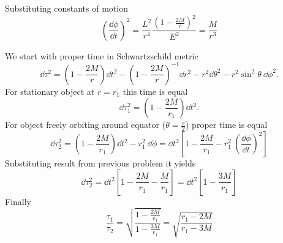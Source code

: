 %
Substituting constants of motion
%
\begin{equation}
    \boxed{\left(\frac{\dd \phi}{\dd t}\right)^2 =
        \frac{L^2}{r^4}
        \frac{\left(1-\frac{2M}{r}\right)^2}{E^2} =
        \frac{M}{r^3}}
\end{equation}
%
%

\problem

We start with proper time in Schwartzschild metric
%
\begin{equation}
    \dd \tau^2 = \left(1-\frac{2M}{r}\right) \dd t^2 -
    \left(1-\frac{2M}{r}\right)^{-1} \dd r^2 -
    r^2 \dd \theta^2 -
    r^2 \sin^2\theta~ \dd \phi ^2.
\end{equation}
%
For stationary object at $r=r_1$ this time is equal
%
\begin{equation}
    \dd \tau_1^2 = \left(1-\frac{2M}{r_1}\right) \dd t^2.
\end{equation}
%
For object freely orbiting around equator ($\theta = \frac{\pi}{2}$) proper time
is equal
%
\begin{equation}
    \dd \tau_2^2 = \left(1-\frac{2M}{r_1}\right) \dd t^2 -
    r_1^2 ~\dd \phi =
    \dd t^2 \left[1-\frac{2M}{r_1}  -
        r_1^2 ~ \left(\frac{\dd \phi}{\dd t}\right)^2\right]
\end{equation}
%
Substituting result from previous problem it yields
%
\begin{equation}
    \dd \tau_2^2 =
    \dd t^2 \left[1-\frac{2M}{r_1}  -
        \frac{M}{r_1}\right]=
    \dd t^2 \left[1-\frac{3M}{r_1}\right]
\end{equation}
%
Finally
%
\begin{equation}
    \boxed{\frac{\tau_1}{\tau_2} =
        \sqrt{\frac{1-\frac{2M}{r_1}}{1-\frac{3M}{r_1}}} =
        \sqrt{\frac{r_1-2M}{r_1-3M}}}
\end{equation}
